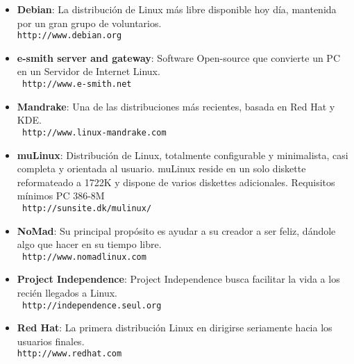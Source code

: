 \begin{itemize}


\item  {\bf Debian}:  La distribución  de
Linux más  libre disponible hoy  día, mantenida  por un gran  grupo de
voluntarios. \\ {\tt http://www.debian.org}


\item  {\bf  e-smith server  and  gateway}:  Software Open-source  que
convierte  un   PC  en  un   Servidor  de  Internet  Linux.   \\  {\tt
http://www.e-smith.net}

\item  {\bf   Mandrake}:  Una   de  las
distribuciones más  recientes, basada en  Red Hat y {\sf  KDE}.\\ {\tt
http://www.linux-mandrake.com}

\item {\bf  muLinux}: Distribución  de Linux,  totalmente configurable
y  minimalista,   casi  completa  y  orientada   al  usuario.  muLinux
reside  en  un  solo  diskette  reformateado  a  1722K  y  dispone  de
varios  diskettes adicionales.  Requisitos mínimos  PC 386-8M  \\ {\tt
http://sunsite.dk/mulinux/}

\item {\bf  NoMad}: Su principal  propósito es  ayudar a su  creador a
ser  feliz,  dándole algo  que  hacer  en  su  tiempo libre.  \\  {\tt
http://www.nomadlinux.com}

\item   {\bf  Project   Independence}:   Project  Independence   busca
facilitar  la   vida  a   los  recién  llegados   a  Linux.   \\  {\tt
http://independence.seul.org}

\item   {\bf  Red   Hat}:   La  primera
distribución Linux en dirigirse seriamente hacia los usuarios finales.
\\ {\tt http://www.redhat.com}


\end{itemize}
